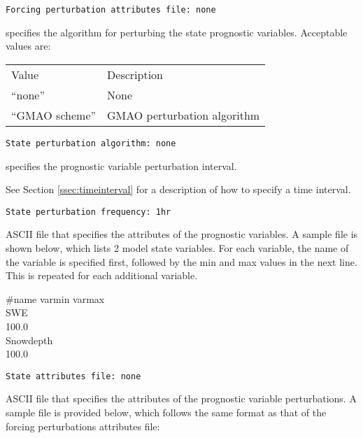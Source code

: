  \begin{Verbatim}[frame=single]
Forcing perturbation attributes file: none
 \end{Verbatim}

 
  specifies the algorithm for
 perturbing the state prognostic variables.
 Acceptable values are: 

 \begin{tabular}{ll}
 Value           & Description                 \\
 ``none''        & None                        \\
 ``GMAO scheme'' & GMAO perturbation algorithm \\
 \end{tabular}
 

 \begin{Verbatim}[frame=single]
State perturbation algorithm: none
 \end{Verbatim}

 
  specifies the prognostic variable
 perturbation interval.

 See Section \ref{ssec:timeinterval} for a description
 of how to specify a time interval.
 

 \begin{Verbatim}[frame=single]
State perturbation frequency: 1hr
 \end{Verbatim}

 
  ASCII file that specifies
 the attributes of the prognostic variables. 
 A sample file is shown below, which lists 2 model state
 variables. For each variable, the name of the variable is 
 specified first, followed by the min and max values in the 
 next line. This is repeated for each additional variable.  

 \#name  varmin  varmax \\
 \indent SWE                    \\
    100.0            \\
 \indent Snowdepth              \\
    100.0
 

 \begin{Verbatim}[frame=single]
State attributes file: none
 \end{Verbatim}

 
  ASCII file that specifies
 the attributes of the prognostic variable perturbations. 
 A sample file is provided below, which follows the same format 
 as that of the forcing perturbations attributes file: 

